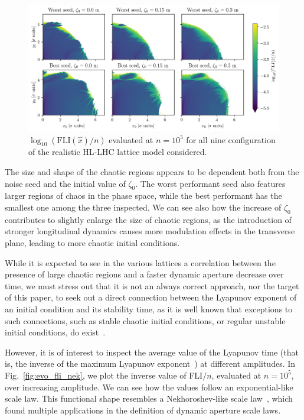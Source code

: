 \begin{figure}
    \centering
    \includegraphics[width=1.0\textwidth]{6_lhc_dynamic_indicators/figs/fli_all.png}
    \caption{$\log_{10}(\mathrm{FLI}(\hat{x})/n)$ evaluated at $n=10^5$ for all nine configuration of the realistic HL-LHC lattice model considered.}
    \label{fig:fli_all}
\end{figure}

The size and shape of the chaotic regions appears to be dependent both from the noise seed and the initial value of $\zeta_0$. The worst performant seed also features larger regions of chaos in the phase space, while the best performant has the smallest one among the three inspected. We can see also how the increase of $\zeta_0$ contributes to slightly enlarge the size of chaotic regions, as the introduction of stronger longitudinal dynamics causes more modulation effects in the transverse plane, leading to more chaotic initial conditions. 

While it is expected to see in the various lattices a correlation between the presence of large chaotic regions and a faster dynamic aperture decrease over time, we must stress out that it is not an always correct approach, nor the target of this paper, to seek out a direct connection between the Lyapunov exponent of an initial condition and its stability time, as it is well known that exceptions to such connections, such as stable chaotic initial conditions, or regular unstable initial conditions, do exist~\cite{}.

However, it is of interest to inspect the average value of the Lyapunov time (that is, the inverse of the maximum Lyapunov exponent~\cite{}) at different amplitudes. In Fig.~\ref{fig:evo_fli_nek}, we plot the inverse value of FLI$/n$, evaluated at $n=10^5$, over increasing amplitude. We can see how the values follow an exponential-like scale law. This functional shape resembles a Nekhoroshev-like scale law~\cite{}, which found multiple applications in the definition of dynamic aperture scale laws.

